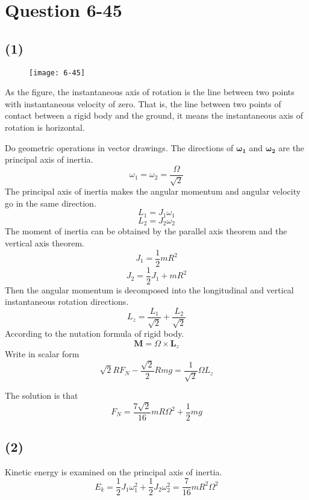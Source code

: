\documentclass[12pt,a4paper]{article}%
\begin{document}
	\section{Question 6-45}
	\subsection*{(1)}
	\begin{figure}[H]
		\centering
		\texttt{[image: 6-45]}
		\caption*{}
		\label{fig:6-45}
	\end{figure}
	\noindent As the figure, the instantaneous axis of rotation is the line between two points with instantaneous velocity of zero. That is, the line between two points of contact between a rigid body and the ground, it means the instantaneous axis of rotation is horizontal.
	
	\noindent Do geometric operations in vector drawings. The directions of $\boldsymbol{\omega_1}$ and $\boldsymbol{\omega_2}$ are the principal axis of inertia.
	\begin{equation}
		\omega_1=\omega_2=\frac{\varOmega}{\sqrt{2}}
	\end{equation}
	The principal axis of inertia makes the angular momentum and angular velocity go in the same direction.
	\begin{equation}
		L_1=J_1\omega_1
	\end{equation}
	\begin{equation}
		L_2=J_2\omega_2
	\end{equation}
	The moment of inertia can be obtained by the parallel axis theorem and the vertical axis theorem.
	\begin{equation}
		J_1=\frac{1}{2}mR^2
	\end{equation}
	\begin{equation}
		J_2=\frac{1}{2}J_1+mR^2
	\end{equation}
	Then the angular momentum is decomposed into the longitudinal and vertical instantaneous rotation directions.
	\begin{equation}
		L_{z}=\frac{L_1}{\sqrt{2}}+\frac{L_2}{\sqrt{2}}
	\end{equation}
	According to the nutation formula of rigid body.
	\begin{equation}
		\boldsymbol{M}=\boldsymbol{\varOmega}\times\boldsymbol{L}_{z}
	\end{equation}
	Write in scalar form
	\begin{equation}
		\sqrt{2}RF_{N}-\frac{\sqrt{2}}{2}Rmg=\frac{1}{\sqrt{2}}\varOmega L_{z}
	\end{equation}
	
	\noindent The solution is that
	$$
	F_{N}=\frac{7\sqrt{2}}{16}mR\varOmega^2+\frac{1}{2}mg
	$$
	\subsection*{(2)}
	\noindent Kinetic energy is examined on the principal axis of inertia.
	$$
	E_k=\frac{1}{2}J_1\omega_1^2+\frac{1}{2}J_2\omega_2^2=\frac{7}{16}mR^2\varOmega^2
	$$
\end{document}
